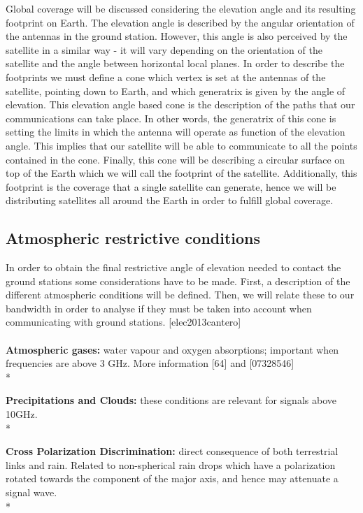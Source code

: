 \documentclass{article}
\begin{document}
Global coverage will be discussed considering the elevation angle and its resulting footprint on Earth. The elevation angle is described by the angular orientation of the antennas in the ground station. However, this angle is also perceived by the satellite in a similar way - it will vary depending on the orientation of the satellite and the angle between horizontal local planes. In order to describe the footprints we must define a cone which vertex is set at the antennas of the satellite, pointing down to Earth, and which generatrix is given by the angle of elevation. This elevation angle based cone is the description of the paths that our communications can take place. In other words, the generatrix of this cone is setting the limits in which the antenna will operate as function of the elevation angle. This implies that our satellite will be able to communicate to all the points contained in the cone. Finally, this cone will be describing a circular surface on top of the Earth which we will call the footprint of the satellite. Additionally, this footprint is the coverage that a single satellite can generate, hence we will be distributing satellites all around the Earth in order to fulfill global coverage. 



\subsection{Atmospheric restrictive conditions}
In order to obtain the final restrictive angle of elevation needed to contact the ground stations some considerations have to be made. First, a description of the different atmospheric conditions will be defined. Then, we will relate these to our bandwidth in order to analyse if they must be taken into account when communicating with ground stations. [elec2013cantero]
\paragraph{    }
\textendash\textbf{ Atmospheric gases: }water vapour and oxygen absorptions; important when frequencies are above 3 GHz. More information [64] and [07328546]\\*

\textendash\textbf{ Precipitations and Clouds: }these conditions are relevant for signals above 10GHz. \\*

\textendash\textbf{ Cross Polarization Discrimination: }direct consequence of both terrestrial links and rain. Related to non-spherical rain drops which have a polarization rotated towards the component of the major axis, and hence may attenuate a signal wave. \\*
\end{document}
